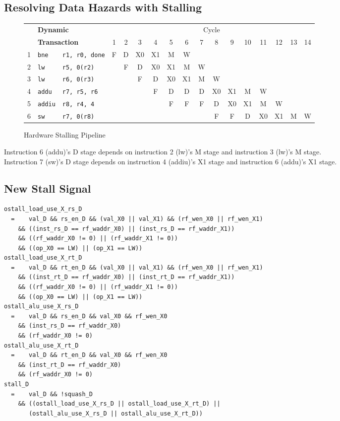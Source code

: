\documentclass[10pt]{article}
\begin{document}
\subsection{Resolving Data Hazards with Stalling}
\begin{figure}[H]
\centering
\begin{tabular}{cll|c|c|c|c|c|c|c|c|c|c|c|c|c|c}
\hline
& \multicolumn{2}{l}{\textbf{Dynamic}} & \multicolumn{14}{c}{Cycle} \\
& \multicolumn{2}{l}{\textbf{Transaction}} & 1 & 2 & 3 & 4 & 5 & 6 & 7 & 8 & 9 & 10 & 11 & 12 & 13 & 14\\
\hline
1 & \texttt{bne} & \texttt{r1, r0, done} & F & D & X0 & X1 & M & W & & & & & & & &\\
\hline
2 & \texttt{lw} & \texttt{r5, 0(r2)} & & F & D & X0 & X1 & M & W & & & & & & &\\
\hline
3 & \texttt{lw} & \texttt{r6, 0(r3)} & & & F & D & X0 & X1 & M & W & & & & & &\\
\hline
4 & \texttt{addu} & \texttt{r7, r5, r6} & & & & F & D & D & D & X0 & X1 & M & W & & &\\
\hline
5 & \texttt{addiu} & \texttt{r8, r4, 4} & & & & & F & F & F & D & X0 & X1 & M & W & &\\
\hline
6 & \texttt{sw} & \texttt{r7, 0(r8)} & & & & & & & & F & F & D & X0 & X1 & M & W \\
\hline
\end{tabular}
\caption{Hardware Stalling Pipeline}
\label{fig:sixstage_hardwarestall_pipe_diagram}
\end{figure}
Instruction 6 (addu)'s D stage depends on instruction 2 (lw)'s M stage and instruction 3 (lw)'s M stage.\\
Instruction 7 (sw)'s D stage depends on instruction 4 (addiu)'s X1 stage and instruction 6 (addu)'s X1 stage.\\

\subsection{New Stall Signal}
\begin{lstlisting}
ostall_load_use_X_rs_D
  =    val_D && rs_en_D && (val_X0 || val_X1) && (rf_wen_X0 || rf_wen_X1)
    && ((inst_rs_D == rf_waddr_X0) || (inst_rs_D == rf_waddr_X1)) 
    && ((rf_waddr_X0 != 0) || (rf_waddr_X1 != 0))
    && ((op_X0 == LW) || (op_X1 == LW))
ostall_load_use_X_rt_D
  =    val_D && rt_en_D && (val_X0 || val_X1) && (rf_wen_X0 || rf_wen_X1)
    && ((inst_rt_D == rf_waddr_X0) || (inst_rt_D == rf_waddr_X1)) 
    && ((rf_waddr_X0 != 0) || (rf_waddr_X1 != 0))
    && ((op_X0 == LW) || (op_X1 == LW))
ostall_alu_use_X_rs_D
  =    val_D && rs_en_D && val_X0 && rf_wen_X0
    && (inst_rs_D == rf_waddr_X0) 
    && (rf_waddr_X0 != 0)
ostall_alu_use_X_rt_D
  =    val_D && rt_en_D && val_X0 && rf_wen_X0
    && (inst_rt_D == rf_waddr_X0) 
    && (rf_waddr_X0 != 0)
stall_D
  =    val_D && !squash_D
    && ((ostall_load_use_X_rs_D || ostall_load_use_X_rt_D) || 
       (ostall_alu_use_X_rs_D || ostall_alu_use_X_rt_D))
\end{lstlisting}
\end{document}
